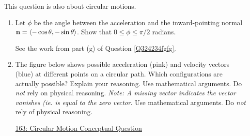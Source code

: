 \documentclass{ximera}
\begin{document}
\begin{question}  \label{Q32frr3r4r4}
This question is also about circular motions.
\begin{enumerate}

\item Let $\phi$ be the angle between the acceleration and the inward-pointing normal ${\bf n}  = \langle -\cos\theta, -\sin\theta \rangle$. Show that $0\leq \phi \leq \pi/2$ radians.

\begin{hint}
See the work from part (g) of Question \ref{Q324234fgfg}.
\end{hint}

\item The figure below shows possible acceleration (pink) and velocity vectors (blue) at different points on a circular path. Which configurations are actually possible? Explain your reasoning.  Use mathematical arguments. Do \emph{not} rely on physical reasoning. \emph{Note: A missing vector indicates the vector vanishes (ie. is equal to the zero vector}. Use mathematical arguments. Do \emph{not} rely of physical reasoning. 

\begin{freeResponse}
\end{freeResponse}

\begin{onlineOnly}
    \begin{center}
\end{center}
\end{onlineOnly}

\href{https://www.geogebra.org/classic/yzcwddhb}{163: Circular Motion Conceptual Question}

\end{enumerate}

\end{question}
\end{document}
